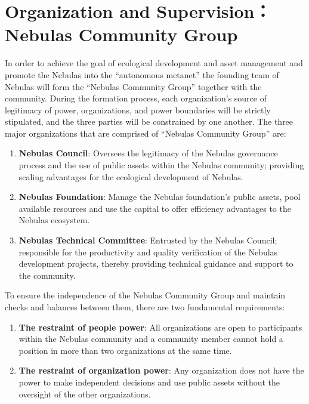 \section{Organization and Supervision：Nebulas Community Group}

In order to achieve the goal of ecological development and asset management and promote the Nebulas into the “autonomous metanet” the founding team of Nebulas will form the “Nebulas Community Group” together with the community. During the formation process, each organization’s source of legitimacy of power, organizations, and power boundaries will be strictly stipulated, and the three parties will be constrained by one another. The three major organizations that are comprised of “Nebulas Community Group” are:

\begin{enumerate}
	\item \textbf{Nebulas Council}: Oversees the legitimacy of the Nebulas governance process and the use of public assets within the Nebulas community; providing scaling advantages for the ecological development of Nebulas.
	\item \textbf{Nebulas Foundation}: Manage the Nebulas foundation’s public assets, pool available resources and use the capital to offer efficiency advantages to the Nebulas ecosystem.
	\item \textbf{Nebulas Technical Committee}: Entrusted by the Nebulas Council; responsible for the productivity and quality verification of the Nebulas development projects, thereby providing technical guidance and support to the community.
\end{enumerate}

\vspace{2em}

To ensure the independence of the Nebulas Community Group and maintain checks and balances between them, there are two fundamental requirements:

\begin{enumerate}
	\item \textbf{The restraint of people power}: All organizations are open to participants within the Nebulas community and a community member cannot hold a position in more than two organizations at the same time.
	\item \textbf{The restraint of organization power}: Any organization does not have the power to make independent decisions and use public assets without the oversight of the other organizations.
\end{enumerate}

